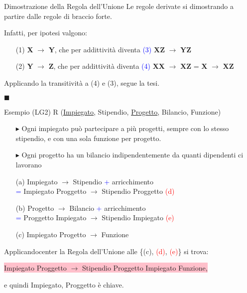 \documentclass{beamer}
\begin{document}
\begin{frame}{Dimostrazione della Regola dell'Unione}
    Le regole derivate si dimostrando a partire dalle regole di braccio forte. \par
    Infatti, per ipotesi valgono:
    \begin{enumerate}
        \item[(1)] \textbf{X} $\rightarrow$ \textbf{Y}, che per addittività diventa \textcolor{blue}{(3)} \textbf{XZ} $\rightarrow$ \textbf{YZ}
        \item[(2)] \textbf{Y} $\rightarrow$ \textbf{Z}, che per addittività diventa \textcolor{blue}{(4)} \textbf{XX} $\rightarrow$ \textbf{XZ} = \textbf{X} $\rightarrow$ \textbf{XZ}
    \end{enumerate}
    
    Applicando la transitività a (4) e (3), segue la tesi. \par
    \raggedleft
    \huge
    $\blacksquare$\hspace{1cm}
    
\end{frame}

\begin{frame}{Esempio (LG2)}
    \Large R (\underline{Impiegato}, Stipendio, \underline{Progetto}, Bilancio, Funzione)
    \normalsize
    \begin{itemize}
        \item[$\blacktriangleright$] Ogni impiegato può partecipare a più progetti, sempre con lo stesso stipendio, e con una sola funzione per progetto.
        \item[$\blacktriangleright$] Ogni progetto ha un bilancio indipendentemente da quanti dipendenti ci lavorano 
    \end{itemize}
    \hrulefill
    \begin{enumerate}
        \item[(a)] Impiegato $\rightarrow$ Stipendio \textcolor{blue}{+} arricchimento
        \\ \hspace{2.5cm}\textcolor{blue}{=} Impiegato Proggetto $\rightarrow$ Stipendio Proggetto \textcolor{red}{(d)}
        \item[(b)] Progetto $\rightarrow$ Bilancio \textcolor{blue}{+} arricchimento
        \\ \hspace{2.5cm}\textcolor{blue}{=} Proggetto Impiegato $\rightarrow$ Stipendio Impiegato \textcolor{red}{(e)}
        \item[(c)] Impiegato Progetto $\rightarrow$ Funzione
    \end{enumerate}
    Applicandocenter la Regola dell'Unione alle \{(c), \textcolor{red}{(d)}, \textcolor{red}{(e)}\} si trova:\par 
    \begin{center}
        \colorbox{pink}{Impiegato Proggetto $\rightarrow$ Stipendio Proggetto Impiegato Funzione,} 
    \end{center}
    e quindi {Impiegato, Proggetto} è chiave.
    
\end{frame}
\end{document}
